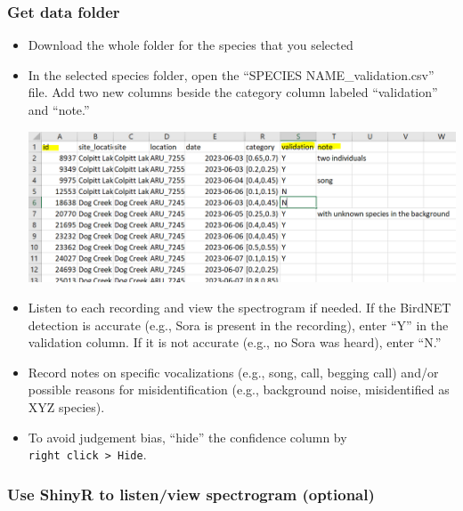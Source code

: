 \documentclass[
]{article}
\providecommand{\tightlist}{%
  \setlength{\itemsep}{0pt}\setlength{\parskip}{0pt}}
\begin{document}
\subsubsection{Get data folder}\label{get-data-folder}

\begin{itemize}
\tightlist
\item
  Download the whole folder for the species that you selected
\end{itemize}

\begin{itemize}
\item
  In the selected species folder, open the ``SPECIES
  NAME\_validation.csv'' file. Add two new columns beside the category
  column labeled ``validation'' and ``note.''

  \includegraphics{images/clipboard-1183498283.png}
\end{itemize}

\begin{itemize}
\tightlist
\item
  Listen to each recording and view the spectrogram if needed. If the
  BirdNET detection is accurate (e.g., Sora is present in the
  recording), enter ``Y'' in the validation column. If it is not
  accurate (e.g., no Sora was heard), enter ``N.''
\item
  Record notes on specific vocalizations (e.g., song, call, begging
  call) and/or possible reasons for misidentification (e.g., background
  noise, misidentified as XYZ species).
\item
  To avoid judgement bias, ``hide'' the confidence column by
  \texttt{right\ click\ \textgreater{}\ Hide}.
\end{itemize}

\subsubsection{Use ShinyR to listen/view spectrogram
(optional)}\label{use-shinyr-to-listenview-spectrogram-optional}
\end{document}
